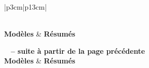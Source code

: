 \begin{center}
\setlength{\arrayrulewidth}{1pt}
\begin{longtable}{|p{3cm}|p{13cm}|}
\caption{Tableau d'exemples de résumés} \label{myResumeLongTable} \\

\hline {} \textbf{Modèles} &  \textbf{Résumés} \\ \hline \hline 
\endfirsthead

%
{{\bfseries \tablename\ \thetable{} \textbf{-- suite à partir de la page précédente}}} \\
\hline {} \textbf{Modèles} &  \textbf{Résumés} \\ \hline \hline
\endhead

\hline {} \\
\endfoot


\end{longtable}
\end{center}
